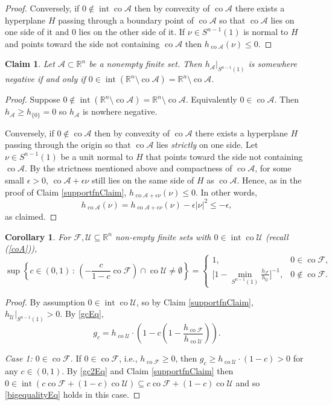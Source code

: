 \documentclass{article}
\newcommand\cA{{\mathcal A}}
\newcommand\cF{{\mathcal F}}
\newcommand\cU{{\mathcal U}}
\newcommand{\RR}{{\mathbb R}}
\renewcommand{\>}{\rightarrow}
\DeclareMathOperator{\Int}{int}
\DeclareMathOperator{\Conv}{co}
\DeclareMathOperator{\co}{co}
\theoremstyle{plain}
\newtheorem{claim}[theorem]{Claim}
\newtheorem{corollary}[theorem]{Corollary}
\theoremstyle{definition}
\newcommand{\beq}{\begin{equation}}
\newcommand{\eeq}{\end{equation}}
\newcommand{\bpf}{\begin{proof}}
\newcommand{\epf}{\end{proof}}
\newcommand{\bcor}{\begin{corollary}}
\newcommand{\ecor}{\end{corollary}}
\newcommand{\bclaim}{\begin{claim}}
\newcommand{\eclaim}{\end{claim}}
\def\lb#1{\label{#1}}
\def\disp{\displaystyle}
\def\eps{\epsilon}
\begin{document}
\begin{proof}
Conversely, if $0\not\in\Int\co\cA$
then by convexity of $\co\cA$ there exists
a hyperplane $H$ passing through a boundary point of $\co\cA$ 
so that $\co\cA$ lies on one
side of it and $0$ lies on the other side of it.
If $\nu\in S^{n-1}(1)$ is normal to $H$ and points toward the side not containing $\co\cA$
then $h_{\co\cA}(\nu)\le0$.
\epf

\bclaim
\lb{supportfn2Claim}
Let $\cA\subset\RR^n$ be a nonempty finite set. Then
$h_\cA|_{S^{n-1}(1)}$ is somewhere negative  if and only if
$0\in \Int(\RR^n\setminus\co\cA)=\RR^n\setminus\co\cA$.

\eclaim
\bpf
Suppose $0\not\in \Int(\RR^n\setminus\co\cA)=\RR^n\setminus\co\cA$.
Equivalently $0\in\Conv\cA$. Then $h_\cA\geq h_{\{0\}}=0$ so $h_\cA$
is nowhere negative. 

Conversely, if $0\notin\Conv\cA$ then by convexity of $\co\cA$ there exists
a hyperplane $H$ passing through the origin 
so that $\co\cA$ lies {\it strictly} on one
side. 
Let $\nu\in S^{n-1}(1)$ be a unit normal to $H$ that points toward the side not containing $\co\cA$.
By the strictness mentioned above and compactness of $\co\cA$,  for some small $\eps>0$, 
$\co\cA+\eps\nu$  still lies on the same side of $H$
as $\co\cA$. Hence, as in the proof of Claim \ref{supportfnClaim}, 
$h_{\co\cA+\eps\nu}(\nu)\le0$. In other words,
$$
h_{\co\cA}(\nu)=h_{\co\cA+\eps\nu}(\nu)-\eps|\nu|^2\le -\eps,
$$
as claimed.
\epf

\bcor
\lb{inclusionCor}
For $\cF,\cU\subseteq\RR^n$ non-empty finite sets with $0\in\Int \co\cU$ (recall (\ref{coA})),
\beq
\lb{bigequalityEq}
\sup\left\{c\in(0,1)\,:\,\left(-\frac{c}{1-c}\co\cF\right)\cap\co\cU\neq\emptyset\right\}
                =
        \begin{cases}
        1,&0\in \co\cF,\\
        \disp\bigg[{1-\min_{S^{n-1}(1)}\frac{h_{\cF}}{h_{\cU}}}
        \bigg]^{-1},&0\notin \co\cF.
        \end{cases}
\eeq
\ecor
    

\bpf
By assumption $0\in\Int\co\cU$, so by Claim
 \ref{supportfnClaim}, $h_{\cU}|_{S^{n-1}(1)}>0$.
By \eqref{gcEq},
\beq
\lb{gc2Eq}
g_c=h_{\Conv\cU}\cdot\left(1-c\left(1-\frac{h_{\Conv\cF}}{h_{\Conv\cU}}\right)\right).
\eeq

\medskip
\noindent
{\it Case 1: $0\in\Conv\cF$.}
If $0\in\Conv\cF$, i.e., $h_{\Conv\cF}\geq0$, then $g_c\geq h_{\Conv\cU}\cdot\left(1-c\right)>0$ for any $c\in(0,1)$. By \eqref{gc2Eq} and Claim
 \ref{supportfnClaim} then $0\in\Int(c\Conv\cF+(1-c)\Conv\cU)\subseteq c\Conv\cF+(1-c)\Conv\cU$ and so 
\eqref{bigequalityEq} holds in this case.



\end{proof}
\end{document}

